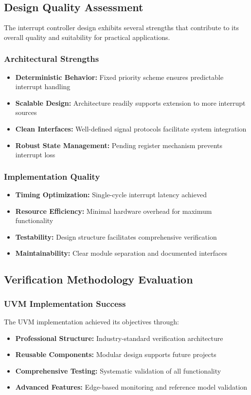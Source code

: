 \documentclass[12pt,a4paper]{article}
\begin{document}
\subsection{Design Quality Assessment}
The interrupt controller design exhibits several strengths that contribute to its overall quality and suitability for practical applications.

\subsubsection{Architectural Strengths}
\begin{itemize}
    \item \textbf{Deterministic Behavior:} Fixed priority scheme ensures predictable interrupt handling
    \item \textbf{Scalable Design:} Architecture readily supports extension to more interrupt sources
    \item \textbf{Clean Interfaces:} Well-defined signal protocols facilitate system integration
    \item \textbf{Robust State Management:} Pending register mechanism prevents interrupt loss
\end{itemize}

\subsubsection{Implementation Quality}
\begin{itemize}
    \item \textbf{Timing Optimization:} Single-cycle interrupt latency achieved
    \item \textbf{Resource Efficiency:} Minimal hardware overhead for maximum functionality
    \item \textbf{Testability:} Design structure facilitates comprehensive verification
    \item \textbf{Maintainability:} Clear module separation and documented interfaces
\end{itemize}

\subsection{Verification Methodology Evaluation}
\subsubsection{UVM Implementation Success}
The UVM implementation achieved its objectives through:
\begin{itemize}
    \item \textbf{Professional Structure:} Industry-standard verification architecture
    \item \textbf{Reusable Components:} Modular design supports future projects
    \item \textbf{Comprehensive Testing:} Systematic validation of all functionality
    \item \textbf{Advanced Features:} Edge-based monitoring and reference model validation
\end{itemize}
\end{document}
